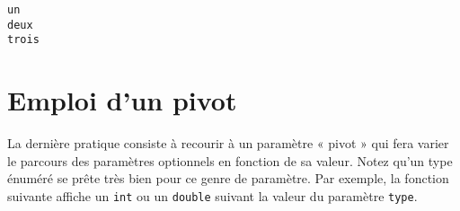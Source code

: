 \documentclass[]{article}
\newenvironment{Shaded}{}{}
\newcommand{\KeywordTok}[1]{\textcolor[rgb]{0.00,0.44,0.13}{\textbf{{#1}}}}
\newcommand{\DataTypeTok}[1]{\textcolor[rgb]{0.56,0.13,0.00}{{#1}}}
\newcommand{\DecValTok}[1]{\textcolor[rgb]{0.25,0.63,0.44}{{#1}}}
\newcommand{\FloatTok}[1]{\textcolor[rgb]{0.25,0.63,0.44}{{#1}}}
\newcommand{\SpecialCharTok}[1]{\textcolor[rgb]{0.25,0.44,0.63}{{#1}}}
\newcommand{\StringTok}[1]{\textcolor[rgb]{0.25,0.44,0.63}{{#1}}}
\newcommand{\ImportTok}[1]{{#1}}
\newcommand{\ControlFlowTok}[1]{\textcolor[rgb]{0.00,0.44,0.13}{\textbf{{#1}}}}
\newcommand{\PreprocessorTok}[1]{\textcolor[rgb]{0.74,0.48,0.00}{{#1}}}
\newcommand{\NormalTok}[1]{{#1}}
\begin{document}
\begin{verbatim}
un
deux
trois
\end{verbatim}

\section{Emploi d'un pivot}\label{emploi-dun-pivot}

La dernière pratique consiste à recourir à un paramètre « pivot » qui
fera varier le parcours des paramètres optionnels en fonction de sa
valeur. Notez qu'un type énuméré se prête très bien pour ce genre de
paramètre. Par exemple, la fonction suivante affiche un \texttt{int} ou
un \texttt{double} suivant la valeur du paramètre \texttt{type}.

\begin{Shaded}
\end{Shaded}
\end{document}
